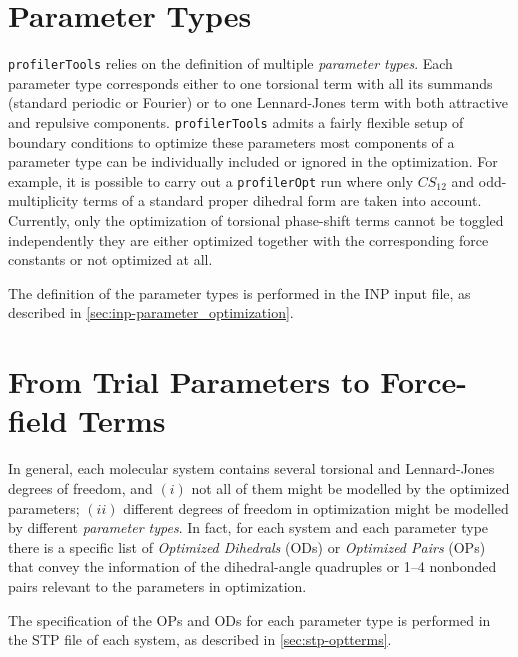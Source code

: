 \documentclass[10pt,a4paper,openany]{memoir}
\numberwithin{equation}{section}
\newcommand{\profileropt}[0]{\texttt{profilerOpt}}
\newcommand{\profilertools}[0]{\texttt{profilerTools}}
\begin{document}
\section{Parameter Types}
\label{sec:parameter-types}

\profilertools{} relies on the definition of multiple
\textit{parameter types}.
%
Each parameter type corresponds either to one torsional term with all
its summands (standard periodic or Fourier) or to one Lennard-Jones
term with both attractive and repulsive components.
%
\profilertools{} admits a fairly flexible setup of boundary conditions
to optimize these parameters
\textemdash{}
most components of a parameter type can be individually included or
ignored in the optimization.
%
For example, it is possible to carry out a \profileropt{} run where
only $CS_{12}$ and odd-multiplicity terms of a standard proper
dihedral form are taken into account.
%
Currently, only the optimization of torsional phase-shift terms cannot
be toggled independently \textemdash{} they are either optimized
together with the corresponding force constants or not optimized at
all.

The definition of the parameter types is performed in the INP input
file, as described in \autoref{sec:inp-parameter_optimization}.

\section{From Trial Parameters to Force-field Terms}
\label{sec:ga-opt-control}

In general, each molecular system contains several torsional and
Lennard-Jones degrees of freedom, and $(i)$ not all of them might be
modelled by the optimized parameters; $(ii)$ different
degrees of freedom in optimization might be modelled by different
\textit{parameter types}.
%
In fact, for each system and each parameter type there is a specific
list of \textit{Optimized Dihedrals} (ODs) or \textit{Optimized Pairs}
(OPs) that convey the information of the dihedral-angle quadruples or
1--4 nonbonded pairs relevant to the parameters in optimization.

The specification of the OPs and ODs for each parameter type is
performed in the STP file of each system, as described in
\autoref{sec:stp-optterms}.
\end{document}
